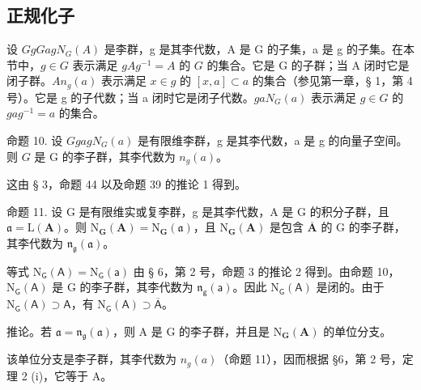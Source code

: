 \subsection{正规化子}

设 \(G\)\(g\)\(G\)\(a\)\(g\)\(N_G(A)\) 是李群，g 是其李代数，A 是 G 的子集，a 是 g 的子集。在本节中，\(g \in G\) 表示满足 \(gAg^{-1} = A\) 的 \(G\) 的集合。它是 G 的子群；当 A 闭时它是闭子群。\(A\)\(n_g(a)\) 表示满足 \(x \in g\) 的 \([x, a] \subset a\) 的集合（参见第一章，§ 1，第 4 号）。它是 g 的子代数；当 a 闭时它是闭子代数。\(g\)\(a\)\(N_G(a)\) 表示满足 \(g \in G\) 的 \(gag^{-1} = a\) 的集合。

命题 10. 设 \(G\)\(g\)\(a\)\(g\)\(N_G(a)\) 是有限维李群，g 是其李代数，a 是 g 的向量子空间。则 \(G\) 是 G 的李子群，其李代数为 \(n_g(a)\)。

这由 § 3，命题 44 以及命题 39 的推论 1 得到。

命题 11. 设 G 是有限维实或复李群，g 是其李代数，A 是 G 的积分子群，且 \(\mathfrak{a} = \mathrm{L}(\mathbf{A})\)。则 \(\mathrm{N}_{\mathbf{G}}(\mathbf{A}) = \mathrm{N}_{\mathbf{G}}(\mathfrak{a})\)，且 \(\mathrm{N}_{\mathbf{G}}(\mathbf{A})\) 是包含 \(\overline{\mathbf{A}}\) 的 G 的李子群，其李代数为 \(\mathfrak{n}_{\mathfrak{g}}(\mathfrak{a})\)。

等式 \(\mathrm{N}_{\mathsf{G}}(\mathsf{A}) = \mathrm{N}_{\mathsf{G}}(\mathsf{a})\) 由 § 6，第 2 号，命题 3 的推论 2 得到。由命题 10，\(\mathrm{N}_{\mathsf{G}}(\mathsf{A})\) 是 G 的李子群，其李代数为 \(\mathfrak{n}_{\mathsf{g}}(\mathsf{a})\)。因此 \(\mathrm{N}_{\mathsf{G}}(\mathsf{A})\) 是闭的。由于 \(\mathrm{N}_{\mathsf{G}}(\mathsf{A}) \supset \mathsf{A}\)，有 \(\mathrm{N}_{\mathsf{G}}(\mathsf{A}) \supset \overline{\mathsf{A}}\)。

推论。若 \(\mathfrak{a} = \mathfrak{n}_{\mathfrak{g}}(\mathfrak{a})\)，则 A 是 G 的李子群，并且是 \(\mathrm{N}_{\mathbf{G}}(\mathbf{A})\) 的单位分支。

该单位分支是李子群，其李代数为 \(n_{g}(a)\)（命题 11），因而根据 §6，第 2 号，定理 2 (i)，它等于 A。
\relax{}
